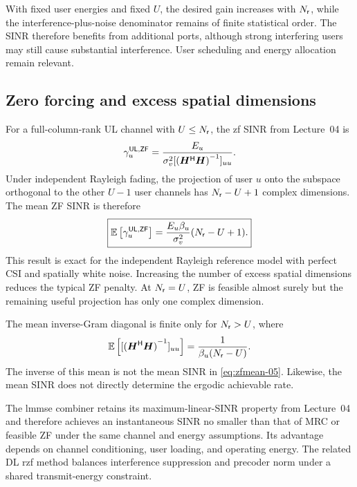 With fixed user energies and fixed $U$, the desired gain increases with $N_{\mathsf{r}}$, while the interference-plus-noise denominator remains of finite statistical order. The SINR therefore benefits from additional ports, although strong interfering users may still cause substantial interference. User scheduling and energy allocation remain relevant.

\subsection{Zero forcing and excess spatial dimensions}
For a full-column-rank UL channel with $U\leq N_{\mathsf{r}}$, the \ac{zf} SINR from Lecture~04 is
\begin{equation*}
	\gamma_u^{\mathsf{UL},\mathsf{ZF}}
	=\frac{E_u}
	{\sigma_v^2[{({\bm{H}}^{\mathsf{H}}\bm{H})}^{-1}]_{uu}}.
\end{equation*}
Under independent Rayleigh fading, the projection of user $u$ onto the subspace orthogonal to the other $U-1$ user channels has $N_{\mathsf{r}}-U+1$ complex dimensions. The mean ZF SINR is therefore
\begin{equation}
	\boxed{
		\mathbb{E}\left[\gamma_u^{\mathsf{UL},\mathsf{ZF}}\right]
		=\frac{E_u\beta_u}{\sigma_v^2}(N_{\mathsf{r}}-U+1).
	}
	\label{eq:zfmean-05}
\end{equation}
This result is exact for the independent Rayleigh reference model with perfect CSI and spatially white noise. Increasing the number of excess spatial dimensions reduces the typical ZF penalty. At $N_{\mathsf{r}}=U$, ZF is feasible almost surely but the remaining useful projection has only one complex dimension.

The mean inverse-Gram diagonal is finite only for $N_{\mathsf{r}}>U$, where
\begin{equation*}
	\mathbb{E}\left[[{({\bm{H}}^{\mathsf{H}}\bm{H})}^{-1}]_{uu}\right]
	=\frac{1}{\beta_u(N_{\mathsf{r}}-U)}.
\end{equation*}
The inverse of this mean is not the mean SINR in \eqref{eq:zfmean-05}. Likewise, the mean SINR does not directly determine the ergodic achievable rate.

The \ac{lmmse} combiner retains its maximum-linear-SINR property from Lecture~04 and therefore achieves an instantaneous SINR no smaller than that of MRC or feasible ZF under the same channel and energy assumptions. Its advantage depends on channel conditioning, user loading, and operating energy. The related DL \ac{rzf} method balances interference suppression and precoder norm under a shared transmit-energy constraint.

